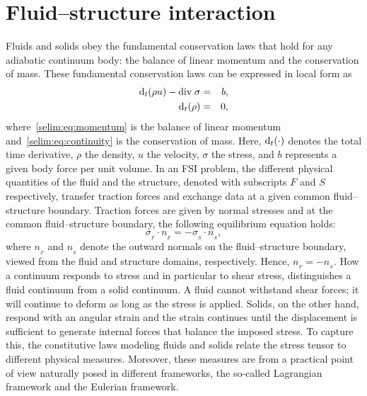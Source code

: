 \section{Fluid--structure interaction}
\label{selim:sec:fsi}

Fluids and solids obey the fundamental conservation laws that hold
for any adiabatic continuum body: the balance of linear momentum and
the conservation of mass.  These fundamental conservation laws can be
expressed in local form as
\begin{eqnarray}
\label{selim:eq:momentum}
\textrm{d}_t(\rho u) - \textrm{div}\; \sigma &=& b, \\
\label{selim:eq:continuity}
\textrm{d}_t(\rho )  &=& 0,
\end{eqnarray}
where~\eqref{selim:eq:momentum} is the balance of linear momentum
and~\eqref{selim:eq:continuity} is the conservation of mass.  Here,
$\textrm{d}_t(\cdot)$ denotes the total time derivative, $\rho$ the density,
$u$ the velocity, $\sigma$ the stress, and $b$ represents a given body
force per unit volume. In an FSI problem, the different physical
quantities of the fluid and the structure, denoted with subscripts
$F$ and $S$ respectively, transfer traction forces and exchange data
at a given common fluid--structure boundary.  Traction forces are
given by normal stresses and at the common fluid--structure boundary,
the following equilibrium equation holds:
\begin{equation}
\label{selim:eq:traction}
\sigma_{_{F}}\cdot n_{_{F}} =  - \sigma_{_{S}}\cdot n_{_{S}},
\end{equation}
where $n_{_{F}}$ and $n_{_{S}}$ denote the outward normals on the
fluid--structure boundary, viewed from the fluid and structure
domains, respectively. Hence, $n_{_{F}} = - n_{_{S}}$.  How a continuum
responds to stress and in particular to shear stress, distinguishes a
fluid continuum from a solid continuum. A fluid cannot withstand shear
forces; it will continue to deform as long as the stress is
applied. Solids, on the other hand, respond with an angular strain and
the strain continues until the displacement is sufficient to generate
internal forces that balance the imposed stress. To capture this, the
constitutive laws modeling fluids and solids relate the stress tensor
to different physical measures. Moreover, these measures are from a
practical point of view naturally posed in different frameworks, the
so-called Lagrangian framework and the Eulerian framework.

